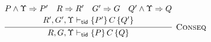 %
%
%

\[
\infer[\textsc{Conseq}]{
R, G,\Upsilon \vdash_\ltid \{P\}\,C\,\{Q\}
}{
\begin{array}{@{}c@{}}
P \wedge \Upsilon \Rightarrow P' \quad R \Rightarrow R' \quad
G' \Rightarrow G \quad Q' \wedge \Upsilon \Rightarrow Q
\\[2pt]
 R', G',\Upsilon \vdash_\ltid \{P'\}\,C\,\{Q'\} 
\end{array}
} 
\]

